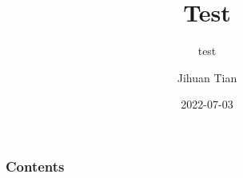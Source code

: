 \documentclass[hyperref, 10pt, c]{beamer}
\begin{document}
\subject{}

\title{Test}
\subtitle{test}
\author{Jihuan Tian}
\date{2022-07-03}

\begin{frame}[plain, t]
  \titlepage
\end{frame}

\begin{frame}
  \frametitle{Contents}
  \tableofcontents
\end{frame}

\end{document}
